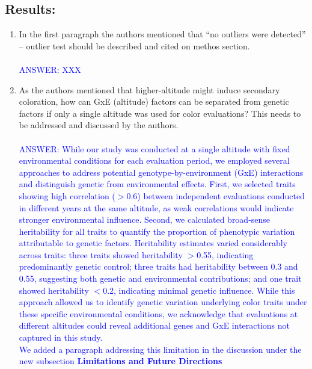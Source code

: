 \documentclass{article}
\begin{document}
\subsection{Results:}
\begin{enumerate}
    \item In the first paragraph the authors mentioned that “no outliers were detected” – outlier test should be described and cited on methos section.\\\\
    \textcolor{blue}{ANSWER: XXX}
    \item As the authors mentioned that higher-altitude might induce secondary coloration, how can GxE (altitude) factors can be separated from genetic factors if only a single altitude was used for color evaluations? This needs to be addressed and discussed by the authors.\\\\
\textcolor{blue}{ANSWER: While our study was conducted at a single altitude with fixed environmental conditions for each evaluation period, we employed several approaches to address potential genotype-by-environment (GxE) interactions and distinguish genetic from environmental effects. First, we selected traits showing high correlation ($>$0.6) between independent evaluations conducted in different years at the same altitude, as weak correlations would indicate stronger environmental influence. Second, we calculated broad-sense heritability for all traits to quantify the proportion of phenotypic variation attributable to genetic factors. Heritability estimates varied considerably across traits: three traits showed heritability $>$0.55, indicating predominantly genetic control; three traits had heritability between 0.3 and 0.55, suggesting both genetic and environmental contributions; and one trait showed heritability $<$0.2, indicating minimal genetic influence. While this approach allowed us to identify genetic variation underlying color traits under these specific environmental conditions, we acknowledge that evaluations at different altitudes could reveal additional genes and GxE interactions not captured in this study.\\}
\textcolor{blue}{We added a paragraph addressing this limitation in the discussion under the new subsection \textbf{Limitations and Future Directions}}


\end{enumerate}
\end{document}
